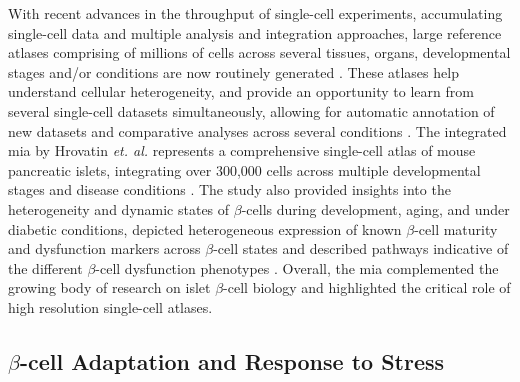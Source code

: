 \par With recent advances in the throughput of single-cell experiments, accumulating single-cell data and multiple analysis and integration approaches, large reference atlases comprising of millions of cells across several tissues, organs, developmental stages and/or conditions are now routinely generated \textbf{\cite{regev_human_2017}}. These atlases help understand cellular heterogeneity, and provide an opportunity to learn from several single-cell datasets simultaneously, allowing for automatic annotation of new datasets and comparative analyses across several conditions \textbf{\cite{rood_impact_2022,lotfollahi_mapping_2021}}. The integrated \gls{mia} by Hrovatin \textit{et. al.} represents a comprehensive single-cell atlas of mouse pancreatic islets, integrating over 300,000 cells across multiple developmental stages and disease conditions \textbf{\cite{hrovatin_delineating_2023}}. The study also provided insights into the heterogeneity and dynamic states of $\beta$-cells during development, aging, and under diabetic conditions, depicted heterogeneous expression of known $\beta$-cell maturity and dysfunction markers across $\beta$-cell states and described pathways indicative of the different $\beta$-cell dysfunction phenotypes \textbf{\cite{hrovatin_delineating_2023}}. Overall, the \gls{mia} complemented the growing body of research on islet $\beta$-cell biology and highlighted the critical role of high resolution single-cell atlases.


\subsection{$\beta$-cell Adaptation and Response to Stress}


